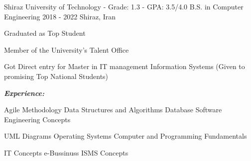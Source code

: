 \begin{cventries}

\cventry
  {Shiraz University of Technology - Grade: 1.3 - GPA: 3.5/4.0} %
  {B.S. in Computer Engineering} %
  {2018 - 2022} %
  {Shiraz, Iran} %
  {
    \begin{cvitems}
      \item {Graduated as Top Student} 
      \item {Member of the University's Talent Office} 
      \item {Got Direct entry for Master in IT management Information Systems (Given to promising Top National Students)}
    \end{cvitems}
    \vspace{5mm}
    \textbf{\emph{Experience:}}
    \vspace{5mm}
    \begin{cvitems}
      \item {
        {Agile Methodology}
        \cpshalf
        {Data Structures and Algorithms} 
        \cpshalf 
        {Database}
        \cpshalf
        {Software Engineering Concepts}
      } 
      \item {
        {UML Diagrams}
        \cpshalf
        {Operating Systems}
        \cpshalf
        {Computer and Programming Fundamentals}
      } 
      \item {
        {IT Concepts}
        \cpshalf
        {e-Bussinuss}
        \cpshalf
        {ISMS Concepts}
      }
    \end{cvitems}
  }
\end{cventries}
